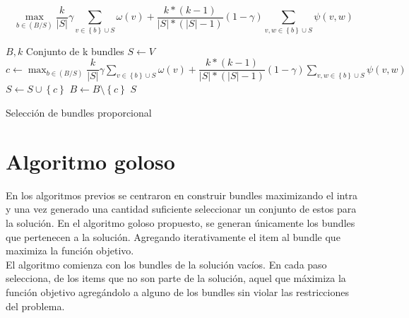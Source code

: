 \begin{equation}
\max_{b \in (B/S)}{\dfrac{k}{|S|}} \gamma \sum_{v \in \left\{b\right\} \cup S}{\omega(v)} + \dfrac{k * (k-1)}{|S| * (|S|-1)} (1-\gamma) \sum_{v,w \in \left\{b\right\} \cup S}{\psi(v,w)}
\end{equation}

\begin{algorithm}[H]
\begin{algorithmic}[1]
\REQUIRE $B, k$
\ENSURE Conjunto de k bundles
\STATE $S \leftarrow V$
\STATE $c \leftarrow \max_{b \in (B/S)}{\dfrac{k}{|S|}} \gamma \sum_{v \in \left\{b\right\} \cup S}{\omega(v)} + \dfrac{k * (k-1)}{|S| * (|S|-1)} (1-\gamma) \sum_{v,w \in \left\{b\right\} \cup S}{\psi(v,w)}$
\STATE $S \leftarrow S \cup \left\{c\right\}$
\STATE $B \leftarrow B \setminus \left\{c\right\}$
\ENDWHILE
\RETURN $S$
\end{algorithmic}
\caption{Selección de bundles proporcional}\label{alg:algSelProp}
\end{algorithm}

\section{Algoritmo goloso}
En los algoritmos previos se centraron en construir bundles maximizando el intra y una vez generado una cantidad suficiente seleccionar un conjunto de estos para la solución. En el algoritmo goloso propuesto, se generan únicamente los bundles que pertenecen a la solución. Agregando iterativamente el item al bundle que maximiza la función objetivo.\\
El algoritmo comienza con los bundles de la solución vacíos. En cada paso selecciona, de los items que no son parte de la solución, aquel que máximiza la función objetivo agregándolo a alguno de los bundles sin violar las restricciones del problema.

